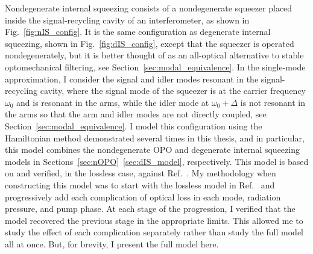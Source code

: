 Nondegenerate internal squeezing consists of a nondegenerate squeezer placed inside the signal-recycling cavity of an interferometer, as shown in Fig.~\ref{fig:nIS_config}. It is the same configuration as degenerate internal squeezing, shown in Fig.~\ref{fig:dIS_config}, except that the squeezer is operated nondegenerately, but it is better thought of as an all-optical alternative to stable optomechanical filtering, see Section~\ref{sec:modal_equivalence}. In the single-mode approximation, I consider the signal and idler modes resonant in the signal-recycling cavity, where the signal mode of the squeezer is at the carrier frequency $\omega_0$ and is resonant in the arms, while the idler mode at $\omega_0+\Delta$ is not resonant in the arms so that the arm and idler modes are not directly coupled, see Section~\ref{sec:modal_equivalence}. 
I model this configuration using the Hamiltonian method demonstrated several times in this thesis, and in particular, this model combines the nondegenerate OPO and degenerate internal squeezing models in Sections~\ref{sec:nOPO}~\ref{sec:dIS_model}, respectively. %
This model is based on and verified, in the lossless case, against Ref.~\cite{Li2020}. 
My methodology when constructing this model was to start with the lossless model in Ref.~\cite{Li2020} and progressively add each complication of optical loss in each mode, radiation pressure, and pump phase. At each stage of the progression, I verified that the model recovered the previous stage in the appropriate limits. This allowed me to study the effect of each complication separately rather than study the full model all at once.  But, for brevity, I present the full model here.

